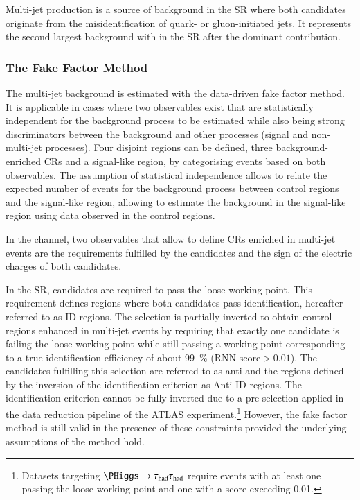 Multi-jet production is a source of background in the \hadhad SR where both
\tauhadvis candidates originate from the misidentification of quark- or
gluon-initiated jets. It represents the second largest background with
\faketauhadvis in the \hadhad SR after the dominant \ttbarFakes contribution.

\subsubsection{The Fake Factor Method}

The multi-jet background is estimated with the data-driven fake factor
method. It is applicable in cases where two observables exist that are
statistically independent for the background process to be estimated while also
being strong discriminators between the background and other processes (signal
and non-multi-jet processes). Four disjoint regions can be defined, three
background-enriched CRs and a signal-like region, by categorising events based
on both observables. The assumption of statistical independence allows to relate
the expected number of events for the background process between control regions
and the signal-like region, allowing to estimate the background in the
signal-like region using data observed in the control regions.

In the \hadhad channel, two observables that allow to define CRs enriched in
multi-jet events are the \tauid requirements fulfilled by the \tauhadvis
candidates and the sign of the electric charges of both candidates.

In the SR, \tauhadvis candidates are required to pass the loose \tauid working
point. This requirement defines regions where both \tauhadvis candidates pass
identification, hereafter referred to as ID regions. The selection is partially
inverted to obtain control regions enhanced in multi-jet events by requiring
that exactly one \tauhadvis candidate is failing the loose \tauid working point
while still passing a working point corresponding to a true \tauhadvis
identification efficiency of about \SI{99}{\percent}
($\text{RNN score} > 0.01$). The \tauhadvis candidates fulfilling this selection
are referred to as anti-\tauhadvis and the regions defined by the inversion of
the identification criterion as Anti-ID regions. The identification criterion
cannot be fully inverted due to a pre-selection applied in the data reduction
pipeline of the ATLAS experiment.\footnote{Datasets targeting
  $\PHiggs \to \hadhad$ require events with at least one \tauhadvis passing the
  loose \tauid working point and one \tauhadvis with a \tauid score exceeding
  0.01.}  However, the fake factor method is still valid in the presence of
these constraints provided the underlying assumptions of the method hold.

